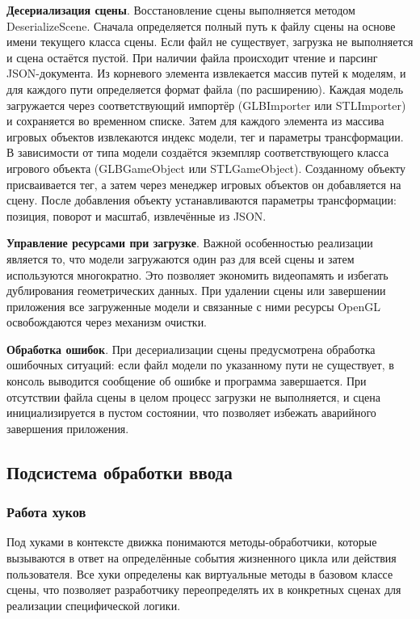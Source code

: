 \textbf{Десериализация сцены}. Восстановление сцены выполняется методом DeserializeScene. Сначала определяется полный путь к файлу сцены на основе имени текущего класса сцены. Если файл не существует, загрузка не выполняется и сцена остаётся пустой. При наличии файла происходит чтение и парсинг JSON-документа. Из корневого элемента извлекается массив путей к моделям, и для каждого пути определяется формат файла (по расширению). Каждая модель загружается через соответствующий импортёр (GLBImporter или STLImporter) и сохраняется во временном списке. Затем для каждого элемента из массива игровых объектов извлекаются индекс модели, тег и параметры трансформации. В зависимости от типа модели создаётся экземпляр соответствующего класса игрового объекта (GLBGameObject или STLGameObject). Созданному объекту присваивается тег, а затем через менеджер игровых объектов он добавляется на сцену. После добавления объекту устанавливаются параметры трансформации: позиция, поворот и масштаб, извлечённые из JSON.

\textbf{Управление ресурсами при загрузке}. Важной особенностью реализации является то, что модели загружаются один раз для всей сцены и затем используются многократно. Это позволяет экономить видеопамять и избегать дублирования геометрических данных. При удалении сцены или завершении приложения все загруженные модели и связанные с ними ресурсы OpenGL освобождаются через механизм очистки.

\textbf{Обработка ошибок}. При десериализации сцены предусмотрена обработка ошибочных ситуаций: если файл модели по указанному пути не существует, в консоль выводится сообщение об ошибке и программа завершается. При отсутствии файла сцены в целом процесс загрузки не выполняется, и сцена инициализируется в пустом состоянии, что позволяет избежать аварийного завершения приложения.

\subsection{Подсистема обработки ввода}
\subsubsection{Работа хуков}
Под хуками в контексте движка понимаются методы-обработчики, которые вызываются в ответ на определённые события жизненного цикла или действия пользователя. Все хуки определены как виртуальные методы в базовом классе сцены, что позволяет разработчику переопределять их в конкретных сценах для реализации специфической логики.

